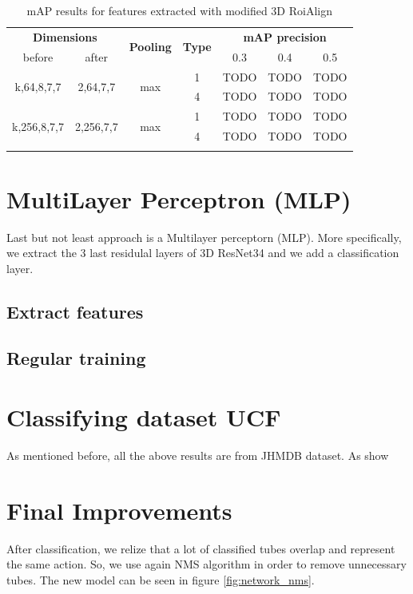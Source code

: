 \documentclass{report}
\begin{document}
\begin{center}
\begin{longtable}{||c | c| c| c||c c c||}

  \hline
 \multicolumn{2}{||c|}{\textbf{Dimensions}} & \multirow{2}{*}{\textbf{Pooling}} &\multirow{2}{*}{ \textbf{Type}} &\multicolumn{3}{|c||}{\textbf{mAP precision}}\\

  before & after & {} & {} & 0.3 &  0.4 & 0.5 \\
  \hline   \hline

  \multirow{2}{*}{k,64,8,7,7} & \multirow{2}{*}{2,64,7,7} & \multirow{2}{*}{max}  & 1 & TODO & TODO & TODO \\
  \cline{4-7}
  {} & {} & {} & 4 & TODO & TODO & TODO   \\
  \hline   
  \multirow{2}{*}{k,256,8,7,7} & \multirow{2}{*}{2,256,7,7} & \multirow{2}{*}{max}  & 1 & TODO & TODO & TODO \\
  \cline{4-7}
  {} & {} & {} & 4 & TODO & TODO & TODO   \\
  \hline   
  \caption{mAP results for features extracted with modified 3D RoiAlign }
  \label{table:svm_mod_roialign}

\end{longtable} 
\end{center}

\section{MultiLayer Perceptron (MLP)}
Last but not least approach is a Multilayer perceptorn (MLP). More specifically, we extract the 3 last residulal layers of 3D ResNet34
and we add a classification layer.  

\subsection{Extract features}


\subsection{Regular training}

\section{Classifying dataset UCF}
As mentioned before, all the above results are from JHMDB dataset. As show
\section{Final Improvements}
After classification, we relize that a lot of classified tubes overlap and represent the same action. So, we use again NMS algorithm in order
to remove unnecessary tubes. The new model can be seen in figure \ref{fig:network_nms}.
\end{document}
